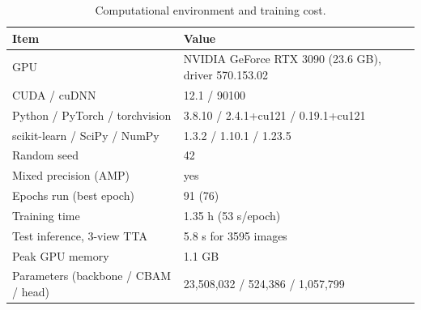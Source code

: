 \begin{table}[ht]
\centering
\small
\caption{Computational environment and training cost.}
\label{tab:environment}
\begin{tabular}{ll}
\toprule
Item & Value \\
\midrule
GPU & NVIDIA GeForce RTX 3090 (23.6 GB), driver 570.153.02 \\
CUDA / cuDNN & 12.1 / 90100 \\
Python / PyTorch / torchvision & 3.8.10 / 2.4.1+cu121 / 0.19.1+cu121 \\
scikit-learn / SciPy / NumPy & 1.3.2 / 1.10.1 / 1.23.5 \\
Random seed & 42 \\
Mixed precision (AMP) & yes \\
Epochs run (best epoch) & 91 (76) \\
Training time & 1.35 h (53 s/epoch) \\
Test inference, 3-view TTA & 5.8 s for 3595 images \\
Peak GPU memory & 1.1 GB \\
Parameters (backbone / CBAM / head) & 23,508,032 / 524,386 / 1,057,799 \\
\bottomrule
\end{tabular}
\end{table}
